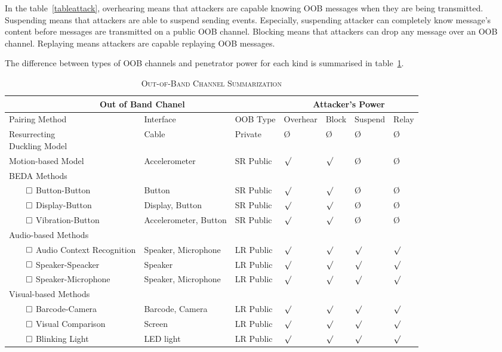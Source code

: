 In the table~\ref{tableattack}, overhearing means that attackers are capable knowing OOB messages when they are being transmitted. Suspending means that attackers are able to suspend sending events. Especially, suspending attacker can completely know message's content before messages are transmitted on a public OOB channel. Blocking means that attackers can drop any message over an OOB channel. Replaying means attackers are capable replaying OOB messages. 

The difference between types of OOB channels and penetrator power for each kind is summarised in table~\ref{channelsum}. 

\begin{table}[ht] \center
\caption{\textsc{Out-of-Band Channel Summarization}}
\label{channelsum}
{\scriptsize
\begin{tabular}{ p{3.5cm} p{3cm} l | l l l l }
\hline
\multicolumn{3}{c}{Out of Band Chanel} & \multicolumn{4}{c}{Attacker's Power} \\
\hline
\hline
Pairing Method & Interface & OOB Type & Overhear &Block & Suspend & Relay  \\
\hline\hline
 \parbox[t]{3cm}{Resurrecting \\ Duckling Model} & Cable & Private & \O & \O & \O& \O \\ \hline
Motion-based Model & Accelerometer & SR Public & $\surd$ & $\surd$  & \O& \O \\ \hline
BEDA Methods & & & & & &  \\ 
$\qed$ Button-Button & Button & SR Public & $\surd$ & $\surd$ & \O& \O  \\ 
$\qed$ Display-Button & Display, Button & SR Public & $\surd$ & $\surd$ &\O & \O  \\ 
$\qed$ Vibration-Button & Accelerometer, Button & SR Public & $\surd$ & $\surd$ & \O & \O  \\ 
\hline 
Audio-based Methods & & & & & &  \\
$\qed$ Audio Context Recognition & Speaker, Microphone & LR Public & $\surd$ & $\surd$ & $\surd$& $\surd$  \\ 
$\qed$ Speaker-Speacker & Speaker & LR Public & $\surd$ & $\surd$ & $\surd$& $\surd$  \\ 
$\qed$ Speaker-Microphone & Speaker, Microphone & LR Public & $\surd$ & $\surd$ & $\surd$ & $\surd$  \\ \hline

Visual-based Methods & & & & & &  \\
$\qed$ Barcode-Camera& Barcode, Camera & LR Public & $\surd$ &$\surd$ &$\surd$ & $\surd$   \\ 
$\qed$ Visual Comparison & Screen & LR Public & $\surd$ & $\surd$ &$\surd$ &$\surd$   \\
$\qed$ Blinking Light & LED light & LR Public & $\surd$ & $\surd$ &$\surd$ &$\surd$   \\ \hline


\end{tabular}}
\end{table}
